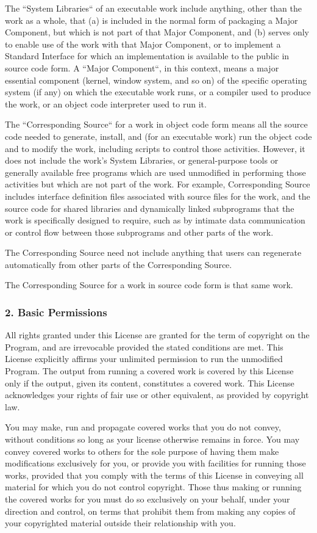 \documentclass[a4paper, 11pt, twoside]{article}
\begin{document}
The “System Libraries“ of an executable work include anything, other than the work as a whole, that (a) is included in the normal form of packaging a Major Component, but which is not part of that Major Component, and (b) serves only to enable use of the work with that Major Component, or to implement a Standard Interface for which an implementation is available to the public in source code form. A “Major Component“, in this context, means a major essential component (kernel, window system, and so on) of the specific operating system (if any) on which the executable work runs, or a compiler used to produce the work, or an object code interpreter used to run it.

The “Corresponding Source“ for a work in object code form means all the source code needed to generate, install, and (for an executable work) run the object code and to modify the work, including scripts to control those activities. However, it does not include the work's System Libraries, or general-purpose tools or generally available free programs which are used unmodified in performing those activities but which are not part of the work. For example, Corresponding Source includes interface definition files associated with source files for the work, and the source code for shared libraries and dynamically linked subprograms that the work is specifically designed to require, such as by intimate data communication or control flow between those subprograms and other parts of the work.

The Corresponding Source need not include anything that users can regenerate automatically from other parts of the Corresponding Source.

The Corresponding Source for a work in source code form is that same work.

\subsubsection{2. Basic Permissions}

All rights granted under this License are granted for the term of copyright on the Program, and are irrevocable provided the stated conditions are met. This License explicitly affirms your unlimited permission to run the unmodified Program. The output from running a covered work is covered by this License only if the output, given its content, constitutes a covered work. This License acknowledges your rights of fair use or other equivalent, as provided by copyright law.

You may make, run and propagate covered works that you do not convey, without conditions so long as your license otherwise remains in force. You may convey covered works to others for the sole purpose of having them make modifications exclusively for you, or provide you with facilities for running those works, provided that you comply with the terms of this License in conveying all material for which you do not control copyright. Those thus making or running the covered works for you must do so exclusively on your behalf, under your direction and control, on terms that prohibit them from making any copies of your copyrighted material outside their relationship with you.
\end{document}

